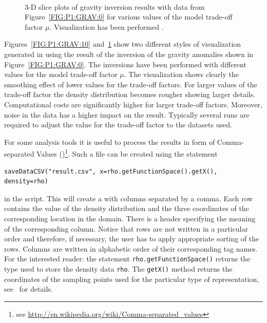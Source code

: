 \begin{figure}
\begin{center}
{        }\\ %
    \end{center}
    \caption{3-D slice plots of gravity inversion results with data from
    Figure~\ref{FIG:P1:GRAV:0} for various values of the model trade-off
    factor $\mu$. Visualization has been performed \VisIt.
    }
    \label{FIG:P1:GRAV:11}
\end{figure}

Figures~\ref{FIG:P1:GRAV:10} and~\ref{FIG:P1:GRAV:11} show two different
styles of visualization generated in \VisIt using the result of the inversion
of the gravity anomalies shown in Figure~\ref{FIG:P1:GRAV:0}.
The inversions have been performed with different values for the model
trade-off factor $\mu$.
The visualization shows clearly the smoothing effect of lower values for the
trade-off factors.
For larger values of the trade-off factor the density distribution becomes
rougher showing larger details.
Computational costs are significantly higher for larger trade-off factors.
Moreover, noise in the data has a higher impact on the result.
Typically several runs are required to adjust the value for the trade-off
factor to the datasets used.

For some analysis tools it is useful to process the results in form of
Comma-separated Values (\CSV)\footnote{see 
\url{http://en.wikipedia.org/wiki/Comma-separated_values}}.
Such a file can be created using the statement
\begin{verbatim}
saveDataCSV("result.csv", x=rho.getFunctionSpace().getX(), density=rho)
\end{verbatim}
in the script.
This will create a  with columns separated by a comma.
Each row contains the value of the density distribution and the three
coordinates of the corresponding location in the domain.
There is a header specifying the meaning of the corresponding column.
Notice that rows are not written in a particular order and therefore, if
necessary, the user has to apply appropriate sorting of the rows.
Columns are written in alphabetic order of their corresponding tag names.
For the interested reader: the statement \verb|rho.getFunctionSpace()| returns
the type used to store the density data \verb|rho|.
The \verb|getX()| method returns the coordinates of the sampling points used
for the particular type of representation, see~\cite{ESCRIPT} for details. 

